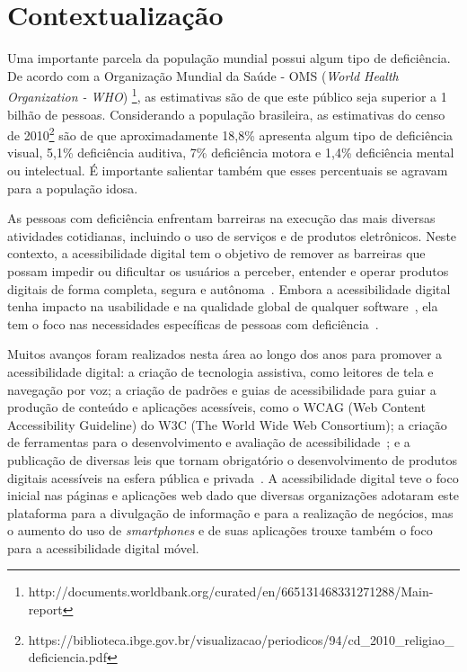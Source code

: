 

\section{Contextualização}

Uma importante parcela da população mundial possui algum tipo de deficiência. 
De acordo com a Organização Mundial da Saúde - OMS (\textit{World Health Organization - WHO}) \footnote{http://documents.worldbank.org/curated/en/665131468331271288/Main-report}, 
as estimativas são de que este público seja superior a 1 bilhão de pessoas. Considerando a população brasileira, as estimativas do censo de 2010\footnote{https://biblioteca.ibge.gov.br/visualizacao/periodicos/94/cd\_2010\_religiao\_deficiencia.pdf} são de que aproximadamente 18,8\% apresenta algum tipo de deficiência visual, 5,1\% deficiência auditiva, 7\% deficiência motora e 1,4\% deficiência mental ou intelectual. É importante salientar também que esses percentuais se agravam para a população idosa.

As pessoas com deficiência enfrentam barreiras na execução das mais diversas atividades cotidianas, incluindo o uso de serviços e de produtos eletrônicos. 
Neste contexto, a acessibilidade digital tem o objetivo de remover as barreiras que possam impedir ou dificultar os usuários a perceber, entender e operar produtos digitais de forma completa, segura e autônoma~\cite{wcag,w3c}.
Embora a acessibilidade digital tenha impacto na usabilidade e na qualidade global de qualquer software~\cite{Gay2018,ISO25010}, ela tem o foco nas necessidades específicas de pessoas com deficiência~\cite{ISO9241:11}.


Muitos avanços foram realizados nesta área ao longo dos anos para promover a acessibilidade digital: a criação de tecnologia assistiva, como leitores de tela e navegação por voz; 
a criação de padrões e guias de acessibilidade para guiar a produção de conteúdo e aplicações acessíveis, como o WCAG (Web Content Accessibility Guideline) do W3C (The World Wide Web Consortium);
a criação de ferramentas para o desenvolvimento e avaliação de acessibilidade~\cite{silva2018dsai};
e a publicação de diversas leis que tornam obrigatório o desenvolvimento de produtos digitais acessíveis na esfera pública e privada~\cite{Lazar2019}.
A acessibilidade digital teve o foco inicial nas páginas e aplicações web dado que diversas organizações adotaram este plataforma para a divulgação de informação e para a realização de negócios, mas o aumento do uso de \textit{smartphones} e de suas aplicações trouxe também o foco para a acessibilidade digital móvel.


